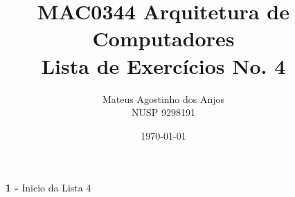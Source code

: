 \documentclass[12pt]{article}
\title{MAC0344 Arquitetura de Computadores\\
Lista de Exercícios No. 4
}
\author{Mateus Agostinho dos Anjos\\NUSP 9298191}
\date{\today}
\begin{document}
	\maketitle
	\begin{itemize}
		\item[\textbf{1 -}]
			\hfill\newline
			Inicio da Lista 4
	\end{itemize}
\end{document}
